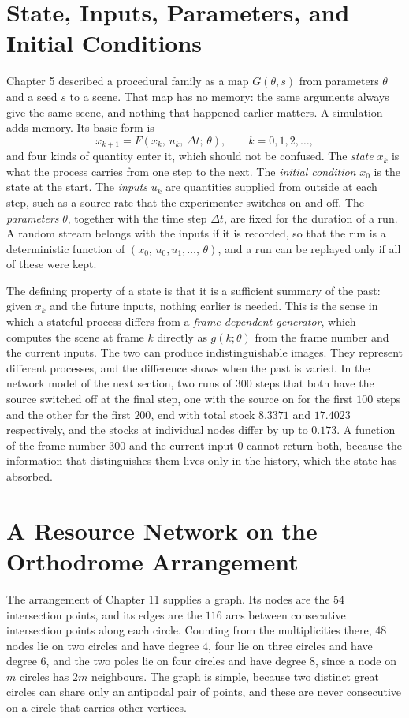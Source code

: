 \section{State, Inputs, Parameters, and Initial Conditions}

Chapter 5 described a procedural family as a map $G(\theta,s)$ from parameters $\theta$ and a seed $s$ to a scene. That map has no memory: the same arguments always give the same scene, and nothing that happened earlier matters. A simulation adds memory. Its basic form is
\[
  x_{k+1}=F(x_k,\,u_k,\,\Delta t;\,\theta),\qquad k=0,1,2,\dots,
\]
and four kinds of quantity enter it, which should not be confused. The \emph{state} $x_k$ is what the process carries from one step to the next. The \emph{initial condition} $x_0$ is the state at the start. The \emph{inputs} $u_k$ are quantities supplied from outside at each step, such as a source rate that the experimenter switches on and off. The \emph{parameters} $\theta$, together with the time step $\Delta t$, are fixed for the duration of a run. A random stream belongs with the inputs if it is recorded, so that the run is a deterministic function of $(x_0,\,u_0,u_1,\dots,\,\theta)$, and a run can be replayed only if all of these were kept.

The defining property of a state is that it is a sufficient summary of the past: given $x_k$ and the future inputs, nothing earlier is needed. This is the sense in which a stateful process differs from a \emph{frame-dependent generator}, which computes the scene at frame $k$ directly as $g(k;\theta)$ from the frame number and the current inputs. The two can produce indistinguishable images. They represent different processes, and the difference shows when the past is varied. In the network model of the next section, two runs of $300$ steps that both have the source switched off at the final step, one with the source on for the first $100$ steps and the other for the first $200$, end with total stock $8.3371$ and $17.4023$ respectively, and the stocks at individual nodes differ by up to $0.173$. A function of the frame number $300$ and the current input $0$ cannot return both, because the information that distinguishes them lives only in the history, which the state has absorbed.

\section{A Resource Network on the Orthodrome Arrangement}

The arrangement of Chapter 11 supplies a graph. Its nodes are the $54$ intersection points, and its edges are the $116$ arcs between consecutive intersection points along each circle. Counting from the multiplicities there, $48$ nodes lie on two circles and have degree $4$, four lie on three circles and have degree $6$, and the two poles lie on four circles and have degree $8$, since a node on $m$ circles has $2m$ neighbours. The graph is simple, because two distinct great circles can share only an antipodal pair of points, and these are never consecutive on a circle that carries other vertices.


